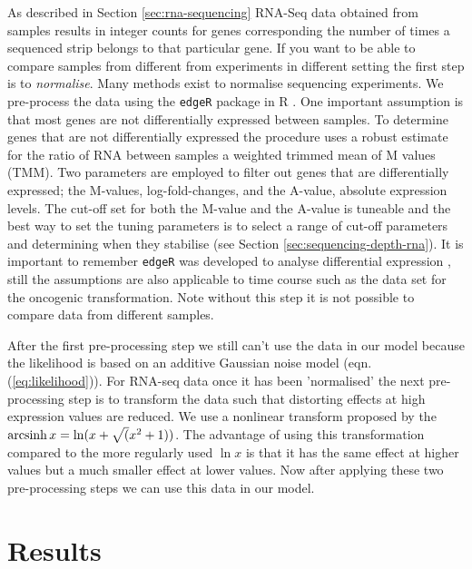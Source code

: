 As described in Section \ref{sec:rna-sequencing} RNA-Seq data obtained from samples results in integer counts for genes corresponding the number of times a sequenced strip belongs to that particular gene. If you want to be able to compare samples from different from experiments in different setting the first step is to \emph{normalise}. Many methods exist to normalise sequencing experiments. We pre-process the data using the \texttt{edgeR} package in R \cite{McCarthy:2012wg,Robinson:2010cw}. One important assumption is that most genes are not differentially expressed between samples. To determine genes that are not differentially expressed the procedure uses a robust estimate for the ratio of RNA between samples a weighted trimmed mean of M values (TMM). Two parameters are employed to filter out genes that are differentially expressed; the M-values, log-fold-changes, and the A-value, absolute expression levels. The cut-off set for both the M-value and the A-value is tuneable and the best way to set the tuning parameters is to select a range of cut-off parameters and determining when they stabilise (see Section \ref{sec:sequencing-depth-rna}). It is important to remember \texttt{edgeR} was developed to analyse differential expression \cite{Robinson:2010dd}, still the assumptions are also applicable to time course such as the data set for the oncogenic transformation. Note without this step it is not possible to compare data from different samples.

After the first pre-processing step we still can't use the data in our model because the likelihood is based on an additive Gaussian noise model (eqn. (\ref{eq:likelihood})). For RNA-seq data once it has been 'normalised' the next pre-processing step is to transform the data such that distorting effects at high expression values are reduced. We use a nonlinear transform proposed by \cite{Hoffman:2012gn} the $\operatorname{arcsinh} x = \ln(x + \sqrt (x^2 + 1))$. The advantage of using this transformation compared to the more regularly used $\ln x$ is that it has the same effect at higher values but a much smaller effect at lower values. Now after applying these two pre-processing steps we can use this data in our model.

\section{Results}
\label{sec:results-mcf10a}

